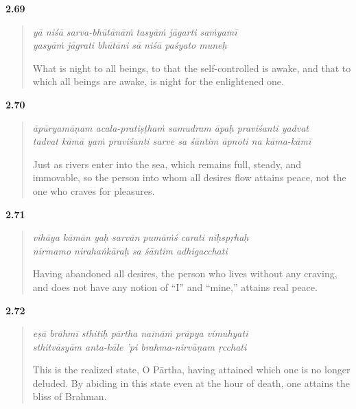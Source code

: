 \par\noindent\textbf{2.69}\par
\begin{verse}
\textit{yā niśā sarva-bhūtānāṁ tasyāṁ jāgarti saṁyamī} \\
\textit{yasyāṁ jāgrati bhūtāni sā niśā paśyato muneḥ}

\noindent What is night to all beings, to that the self-controlled is awake, and that to which all beings are awake, is night for the enlightened one.
\end{verse}
\par



\par\noindent\textbf{2.70}\par
\begin{verse}
\textit{āpūryamāṇam acala-pratiṣṭhaṁ samudram āpaḥ praviśanti yadvat} \\
\textit{tadvat kāmā yaṁ praviśanti sarve sa śāntim āpnoti na kāma-kāmī}

\noindent Just as rivers enter into the sea, which remains full, steady, and immovable, so the person into whom all desires flow attains peace, not the one who craves for pleasures.
\end{verse}
\par



\par\noindent\textbf{2.71}\par
\begin{verse}
\textit{vihāya kāmān yaḥ sarvān pumāṁś carati niḥspṛhaḥ} \\
\textit{nirmamo nirahaṅkāraḥ sa śāntim adhigacchati}

\noindent Having abandoned all desires, the person who lives without any craving, and does not have any notion of \enquote{I} and \enquote{mine,} attains real peace.
\end{verse}
\par



\par\noindent\textbf{2.72}\par
\begin{verse}
\textit{eṣā brāhmī sthitiḥ pārtha naināṁ prāpya vimuhyati} \\
\textit{sthitvāsyām anta-kāle ’pi brahma-nirvāṇam ṛcchati}

\noindent This is the realized state, O Pārtha, having attained which one is no longer deluded. By abiding in this state even at the hour of death, one attains the bliss of Brahman.
\end{verse}
\par


